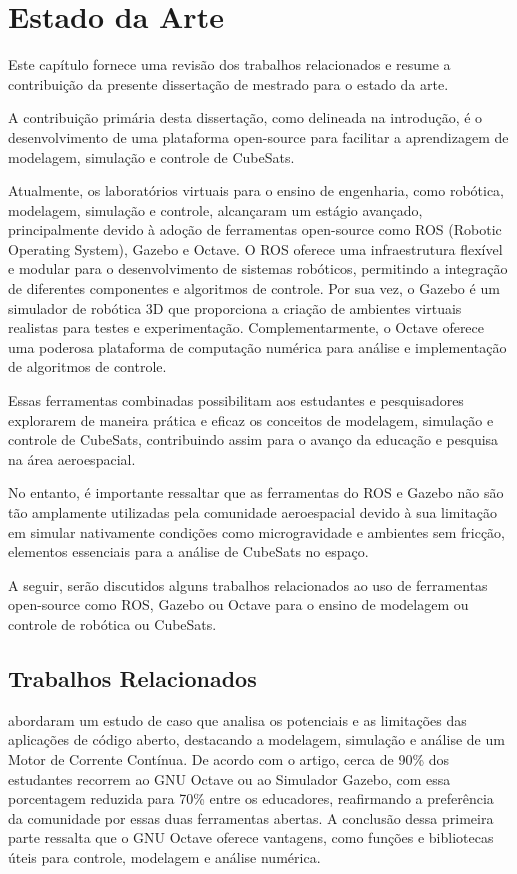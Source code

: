 \chapter{Estado da Arte}\label{cap:estArte}

Este capítulo fornece uma revisão dos trabalhos relacionados e resume a contribuição da presente dissertação de mestrado para o estado da arte.

A contribuição primária desta dissertação, como delineada na introdução, é o desenvolvimento de uma plataforma open-source para facilitar a aprendizagem de modelagem, simulação e controle de CubeSats.

Atualmente, os laboratórios virtuais para o ensino de engenharia, como robótica, modelagem, simulação e controle, alcançaram um estágio avançado, principalmente devido à adoção de ferramentas open-source como ROS (Robotic Operating System), Gazebo e Octave. O ROS oferece uma infraestrutura flexível e modular para o desenvolvimento de sistemas robóticos, permitindo a integração de diferentes componentes e algoritmos de controle. Por sua vez, o Gazebo é um simulador de robótica 3D que proporciona a criação de ambientes virtuais realistas para testes e experimentação. Complementarmente, o Octave oferece uma poderosa plataforma de computação numérica para análise e implementação de algoritmos de controle.

Essas ferramentas combinadas possibilitam aos estudantes e pesquisadores explorarem de maneira prática e eficaz os conceitos de modelagem, simulação e controle de CubeSats, contribuindo assim para o avanço da educação e pesquisa na área aeroespacial.

No entanto, é importante ressaltar que as ferramentas do ROS e Gazebo não são tão amplamente utilizadas pela comunidade aeroespacial devido à sua limitação em simular nativamente condições como microgravidade e ambientes sem fricção, elementos essenciais para a análise de CubeSats no espaço.

A seguir, serão discutidos alguns trabalhos relacionados ao uso de ferramentas open-source como ROS, Gazebo ou Octave para o ensino de modelagem ou controle de robótica ou CubeSats.

\section*{Trabalhos Relacionados}\label{sec:primTrab}

 abordaram um estudo de caso que analisa os potenciais e as limitações das aplicações de código aberto, destacando a modelagem, simulação e análise de um Motor de Corrente Contínua. De acordo com o artigo, cerca de 90\% dos estudantes recorrem ao GNU Octave ou ao Simulador Gazebo, com essa porcentagem reduzida para 70\% entre os educadores, reafirmando a preferência da comunidade por essas duas ferramentas abertas. A conclusão dessa primeira parte ressalta que o GNU Octave oferece vantagens, como funções e bibliotecas úteis para controle, modelagem e análise numérica.

